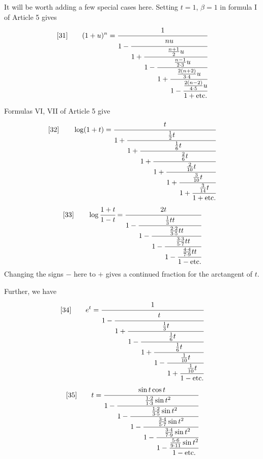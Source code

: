 
It will be worth adding a few special cases here. Setting $t=1$, $\beta=1$ in formula I of Article 5 gives
\[
[31]\qquad
(1+u)^n=
\cfrac{1}{1-\cfrac{nu}{1+\cfrac{\frac{n+1}{2}u}{1-\cfrac{\frac{n-1}{2\cdot3}u}{1+\cfrac{\frac{2(n+2)}{3\cdot4}u}{1-\cfrac{\frac{2(n-2)}{4\cdot5}u}{1+\mathrm{etc.}}}}}}}
\]

Formulas VI, VII of Article 5 give
\[
[32]\qquad
\log(1+t)=
\cfrac{t}{1+\cfrac{\frac12t}{1+\cfrac{\frac16t}{1+\cfrac{\frac26t}{1+\cfrac{\frac2{10}t}{1+\cfrac{\frac3{10}t}{1+\cfrac{\frac3{14}t}{1+\mathrm{etc.}}}}}}}}
\]
\[
[33]\qquad
\log\cfrac{1+t}{1-t}=
\cfrac{2t}{1-\cfrac{\frac13tt}{1-\cfrac{\frac{2\cdot2}{3\cdot5}tt}{1-\cfrac{\frac{3\cdot3}{5\cdot7}tt}{1-\cfrac{\frac{4\cdot4}{7\cdot9}tt}{1-\mathrm{etc.}}}}}}
\]
Changing the signs $-$ here to $+$ gives a continued fraction for the arctangent of $t$.
\par
Further, we have
\[
[34]\qquad
e^t=
\cfrac{1}{1-\cfrac{t}{1+\cfrac{\frac13t}{1-\cfrac{\frac16t}{1+\cfrac{\frac16t}{1-\cfrac{\frac1{10}t}{1+\cfrac{\frac1{10}t}{1-\mathrm{etc.}}}}}}}}
\]
\[
[35]\qquad
t=
\cfrac{\sin t\cos t}{1-\cfrac{\frac{1\cdot2}{1\cdot3}\sin t^2}{1-\cfrac{\frac{1\cdot2}{3\cdot5}\sin t^2}{1-\cfrac{\frac{3\cdot4}{5\cdot7}\sin t^2}{1-\cfrac{\frac{3\cdot4}{7\cdot9}\sin t^2}{1-\cfrac{\frac{5\cdot6}{9\cdot11}\sin t^2}{1-\mathrm{etc.}}}}}}}
\]

